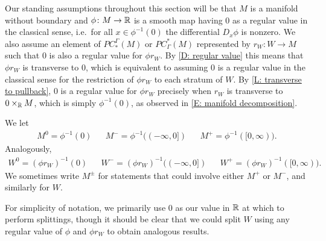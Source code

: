 Our standing assumptions throughout this section will be that $M$ is a manifold without boundary and $\phi \colon M \to \mathbb{R}$ is a smooth map having $0$ as a regular value in the classical sense, i.e.\ for all $x \in \phi^{-1}(0)$ the differential $D_x\phi$ is nonzero.
We also assume an element of $PC_*^\Gamma(M)$ or $PC^*_\Gamma(M)$ represented by $r_W \colon W \to M$ such that $0$ is also a regular value for $\phi r_W$.
By \cref{D: regular value} this means that $\phi r_W$ is transverse to $0$, which is equivalent to assuming $0$ is a regular value in the classical sense for the restriction of $\phi r_W$ to each stratum of $W$.
By \cref{L: transverse to pullback}, $0$ is a regular value for $\phi r_W$ precisely when $r_W$ is transverse to $0 \times_{\mathbb{R}} M$, which is simply $\phi^{-1}(0)$, as observed in \cref{E: manifold decomposition}.

We let
\begin{align*}
	M^0 = \phi^{-1}(0) && M^- = \phi^{-1}((-\infty,0]) &&M^+ = \phi^{-1}([0,\infty)).
\end{align*}
Analogously,
\begin{align*}
	W^0 = (\phi r_W)^{-1}(0) && W^- = (\phi r_W)^{-1}((-\infty,0]) && W^+ = (\phi r_W)^{-1}([0,\infty)).
\end{align*}
We sometimes write $M^\pm$ for statements that could involve either $M^+$ or $M^-$, and similarly for $W$.

\begin{remark}
	For simplicity of notation, we primarily use $0$ as our value in $\mathbb{R}$ at which to perform splittings, though it should be clear that we could split $W$ using any regular value of $\phi$ and $\phi r_W$ to obtain analogous results.
\end{remark}

\begin{comment}
	\begin{lemma}\label{L: 0 transverse M0}
		Zero is a regular value for $\phi r_W$ if and only if $r_W$ is transverse to the inclusion of $M^0$ into $M$.
	\end{lemma}
	\begin{proof}
		As $0$ is a regular value for $\phi$, by classical differential topology $M^0$ is an embedded codimension-one submanifold of $M$, and in a neighborhood of each point of $M^0$, the map $\phi$ behaves up to diffeomorphisms like the standard projection of $\R^m$ to the first coordinate; see Section 1.4 \cite{GuPo74}.
		In particular, at each $z \in M^0$, we have $T_zM^0 = \ker(D_z\phi)$.
		So the linear subspace spanned by a vector $v \in T_zM$ is transverse to $T_zM^0$ if and only if its image under $D_z\phi$ is non-zero.
		It follows that $r_W$ is transverse to $M^0$ if and only if $\phi r_W$ is transverse to $0$.
	\end{proof}
\end{comment}

